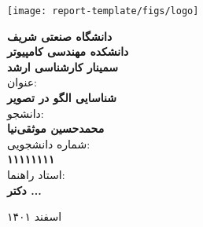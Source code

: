 \thispagestyle{empty}
\begin{center}
\texttt{[image: report-template/figs/logo]}
\vskip 1cm

\large{
{\bf
دانشگاه صنعتی شریف\\ دانشکده مهندسی کامپیوتر\\ سمینار کارشناسی ارشد
}
\\
\vskip 1cm
عنوان:\\
{ \bf
شناسایی الگو در تصویر
}
\\{ \bf \large
{}}
\vskip 1cm
دانشجو:\\
\textbf{محمدحسین موثقی‌نیا}
\\

\vskip 1cm
شماره دانشجویی:\\
\textbf{۱۱۱۱۱۱۱۱}
\\

\vskip 1cm
استاد راهنما:\\
 \textbf{دکتر ...}

\vskip 1.5cm
}
اسفند ۱۴۰۱
\newpage
\end{center}


